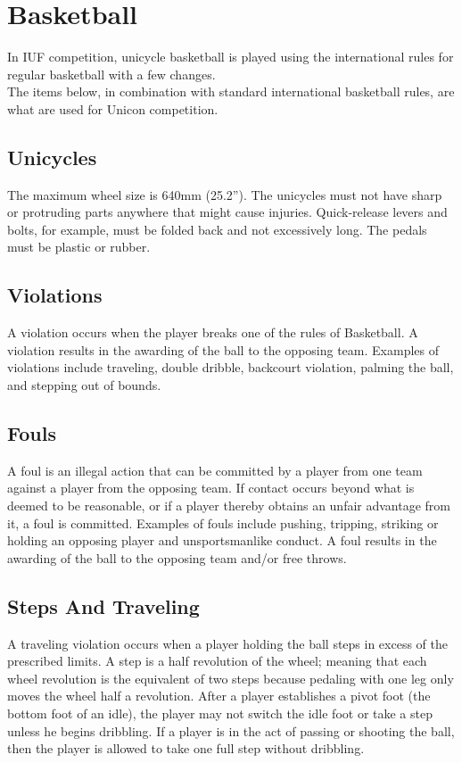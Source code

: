 \chapter{Basketball}
In IUF competition, unicycle basketball is played using the international rules for regular basketball with a few changes.\\
The items below, in combination with standard international basketball rules, are what are used for Unicon competition.

\section{Unicycles}
The maximum wheel size is 640mm (25.2”). The unicycles must not have sharp or protruding parts anywhere that might
cause injuries. Quick-release levers and bolts, for example, must be folded back and not excessively long. The pedals must
be plastic or rubber.

\section{Violations}
A violation occurs when the player breaks one of the rules of Basketball. A violation results in the awarding of the ball to
the opposing team. Examples of violations include traveling, double dribble, backcourt violation, palming the ball, and
stepping out of bounds.

\section{Fouls}
A foul is an illegal action that can be committed by a player from one team against a player from the opposing team. If
contact occurs beyond what is deemed to be reasonable, or if a player thereby obtains an unfair advantage from it, a foul is
committed. Examples of fouls include pushing, tripping, striking or holding an opposing player and unsportsmanlike
conduct. A foul results in the awarding of the ball to the opposing team and/or free throws.

\section{Steps And Traveling}
A traveling violation occurs when a player holding the ball steps in excess of the prescribed limits. A step is a half
revolution of the wheel; meaning that each wheel revolution is the equivalent of two steps because pedaling with one leg
only moves the wheel half a revolution. After a player establishes a pivot foot (the bottom foot of an idle), the player may
not switch the idle foot or take a step unless he begins dribbling. If a player is in the act of passing or shooting the ball,
then the player is allowed to take one full step without dribbling.

